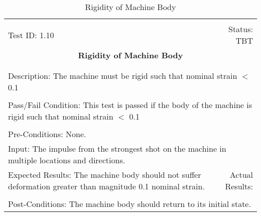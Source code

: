 \documentclass[titlepage]{article}
\begin{document}
\begin{center}%
\begin{table}
\begin{tabular}{|l r|}\hline&\\[-2mm]
	Test ID:   1.10	&Status: TBT\\[-3mm]
	\multicolumn{2}{|c|}{\textbf{\large{Rigidity of Machine Body}}}\\&\\\hline&\\[-3mm]
	\multicolumn{2}{|p{\textwidth}|}{Description: The machine must be rigid such that nominal strain $<$ 0.1}\\[1mm]\hline&\\[-3mm]
	\multicolumn{2}{|p{\textwidth}|}{Pass/Fail Condition: This test is passed if the body of the machine is rigid such that nominal strain $<$ 0.1}\\[1mm]\hline&\\[-3mm]
	\multicolumn{2}{|p{\textwidth}|}{Pre-Conditions: None.}\\[4mm]
	\multicolumn{2}{|p{\textwidth}|}{Input: The impulse from the strongest shot on the machine in multiple locations and directions.}\\[2mm]\hline
	\multicolumn{1}{|p{0.49\textwidth}}{Expected Results: The machine body should not suffer deformation greater than magnitude 0.1 nominal strain.}	&\multicolumn{1}{|p{0.45\textwidth}|}{Actual Results:}\\\hline&\\[-3mm]
	\multicolumn{2}{|p{\textwidth}|}{Post-Conditions: The machine body should return to its initial state.}\\\hline
\end{tabular}
\caption{Rigidity of Machine Body}
\end{table}
\end{center}
\end{document}
